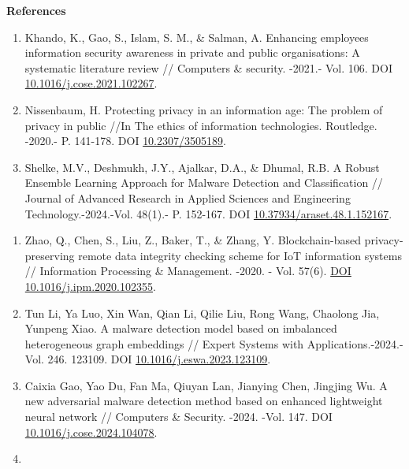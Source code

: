\begin{center}
{\bfseries References}
\end{center}

\begin{references}
\begin{enumerate}
\def\labelenumi{\arabic{enumi}.}
\item
  Khando, K., Gao, S., Islam, S. M., \& Salman, A. Enhancing employees
  information security awareness in private and public organisations: A
  systematic literature review // Computers \& security. -2021.- Vol.
  106. DOI
  \href{https://doi.org/10.1016/j.cose.2021.102267}{10.1016/j.cose.2021.102267}.
\item
  Nissenbaum, H. Protecting privacy in an information age: The problem
  of privacy in public //In The ethics of information technologies.
  Routledge. -2020.- P. 141-178. DOI
  \href{https://doi.org/10.2307/3505189}{10.2307/3505189}.
\item
  Shelke, M.V., Deshmukh, J.Y., Ajalkar, D.A., \& Dhumal, R.B. A Robust
  Ensemble Learning Approach for Malware Detection and Classification //
  Journal of Advanced Research in Applied Sciences and Engineering
  Technology.-2024.-Vol. 48(1).- P. 152-167. DOI \href{https://doi.org/10.37934/araset.48.1.152167}{10.37934/araset.48.1.152167}.
\end{enumerate}
\begin{enumerate}
\def\labelenumi{\arabic{enumi}.}
\setcounter{enumi}{3}
\item
  Zhao, Q., Chen, S., Liu, Z., Baker, T., \& Zhang, Y. Blockchain-based
  privacy-preserving remote data integrity checking scheme for IoT
  information systems // Information Processing \& Management. -2020. -
  Vol. 57(6). \href{https://doi.org/10.1016/j.ipm.2020.102355}{DOI
  10.1016/j.ipm.2020.102355}.
\item
  Tun Li, Ya Luo, Xin Wan, Qian Li, Qilie Liu, Rong Wang, Chaolong Jia,
  Yunpeng Xiao. A malware detection model based on imbalanced
  heterogeneous graph embeddings // Expert Systems with
  Applications.-2024.-Vol. 246. 123109. DOI
  \href{https://doi.org/10.1016/j.eswa.2023.123109}{10.1016/j.eswa.2023.123109}.
\item
  Caixia Gao, Yao Du, Fan Ma, Qiuyan Lan, Jianying Chen, Jingjing Wu. A
  new adversarial malware detection method based on enhanced lightweight
  neural network // Computers \& Security. -2024. -Vol. 147. DOI
  \href{https://doi.org/10.1016/j.cose.2024.104078}{10.1016/j.cose.2024.104078}.
\item

\end{enumerate}
\end{references}
